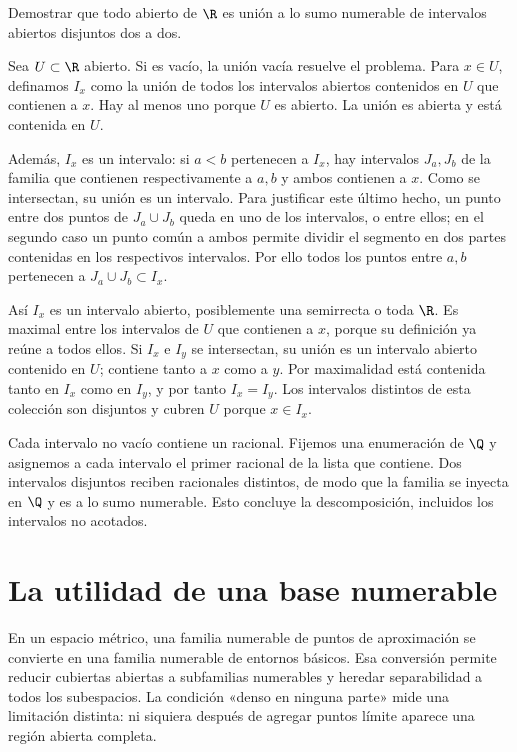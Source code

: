 \begin{ejercicio}\label{ch06:intervalos}
Demostrar que todo abierto de $\R$ es unión a lo sumo numerable de intervalos abiertos disjuntos dos a dos.
\end{ejercicio}
\begin{solucion}
Sea $U\subset\R$ abierto. Si es vacío, la unión vacía resuelve el problema. Para $x\in U$, definamos $I_x$ como la unión de todos los intervalos abiertos contenidos en $U$ que contienen a $x$. Hay al menos uno porque $U$ es abierto. La unión es abierta y está contenida en $U$.

Además, $I_x$ es un intervalo: si $a<b$ pertenecen a $I_x$, hay intervalos $J_a,J_b$ de la familia que contienen respectivamente a $a,b$ y ambos contienen a $x$. Como se intersectan, su unión es un intervalo. Para justificar este último hecho, un punto entre dos puntos de $J_a\cup J_b$ queda en uno de los intervalos, o entre ellos; en el segundo caso un punto común a ambos permite dividir el segmento en dos partes contenidas en los respectivos intervalos. Por ello todos los puntos entre $a,b$ pertenecen a $J_a\cup J_b\subset I_x$.

Así $I_x$ es un intervalo abierto, posiblemente una semirrecta o toda $\R$. Es maximal entre los intervalos de $U$ que contienen a $x$, porque su definición ya reúne a todos ellos. Si $I_x$ e $I_y$ se intersectan, su unión es un intervalo abierto contenido en $U$; contiene tanto a $x$ como a $y$. Por maximalidad está contenida tanto en $I_x$ como en $I_y$, y por tanto $I_x=I_y$. Los intervalos distintos de esta colección son disjuntos y cubren $U$ porque $x\in I_x$.

Cada intervalo no vacío contiene un racional. Fijemos una enumeración de $\Q$ y asignemos a cada intervalo el primer racional de la lista que contiene. Dos intervalos disjuntos reciben racionales distintos, de modo que la familia se inyecta en $\Q$ y es a lo sumo numerable. Esto concluye la descomposición, incluidos los intervalos no acotados.
\end{solucion}

\section{La utilidad de una base numerable}
En un espacio métrico, una familia numerable de puntos de aproximación se convierte en una familia numerable de entornos básicos. Esa conversión permite reducir cubiertas abiertas a subfamilias numerables y heredar separabilidad a todos los subespacios. La condición «denso en ninguna parte» mide una limitación distinta: ni siquiera después de agregar puntos límite aparece una región abierta completa.
